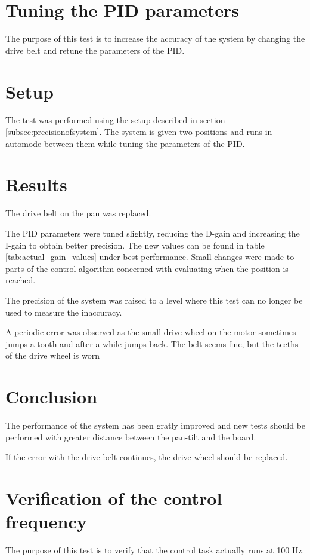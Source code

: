 \section{Tuning the PID parameters}
The purpose of this test is to increase the accuracy of the system by changing
the drive belt and retune the parameters of the PID.

\section*{Setup}
The test was performed using the setup described in section \ref{subsec:precisionofsystem}. The
system is given two positions and runs in automode between them while tuning the
parameters of the PID.

\section*{Results}
The drive belt on the pan was replaced.

The PID parameters were tuned slightly, reducing the D-gain and increasing the
I-gain to obtain better precision. The new values can be found in
table \ref{tab:actual_gain_values} under best performance. Small changes were made to
parts of the control algorithm concerned with evaluating when the position is reached.

The precision of the system was raised to a level where this test can no
longer be used to measure the inaccuracy. 

A periodic error was observed as the small drive wheel on the motor sometimes
jumps a tooth and after a while jumps back. The belt seems fine, but
the teeths of the drive wheel is worn

\section*{Conclusion}
The performance of the system has been gratly improved and new tests should be
performed with greater distance between the pan-tilt and the board. 

If the error with the drive belt continues, the drive wheel should be replaced.


\section{Verification of the control frequency}\label{subsec:control_freq}
The purpose of this test is to verify that the control task actually runs at 100 Hz.

